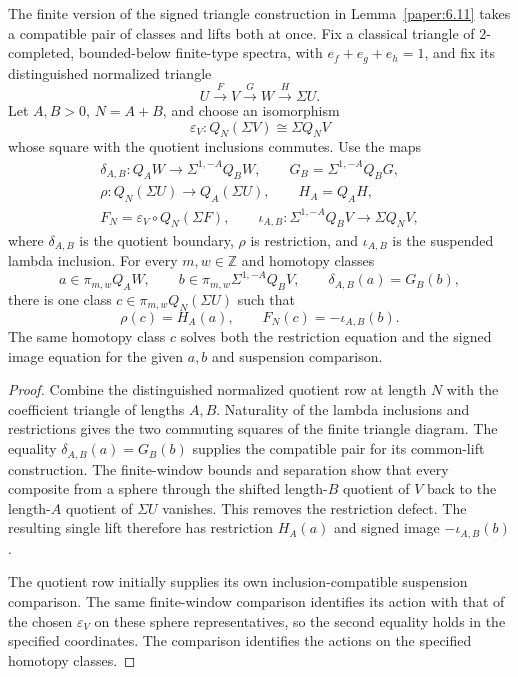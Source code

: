 \begin{lemma}
\label{sem:ProofTools:finite-common-lift}
The finite version of the signed triangle construction in
Lemma~\ref{paper:6.11} takes a compatible pair of classes and lifts
both at once.
Fix a classical triangle of $2$-completed, bounded-below finite-type spectra,
with $e_f+e_g+e_h=1$, and fix its distinguished normalized triangle
\[
 U\xrightarrow F V\xrightarrow G W\xrightarrow H\Sigma U.
\]
Let $A,B>0$, $N=A+B$, and choose an isomorphism
\[
 \varepsilon_V:Q_N(\Sigma V)\cong\Sigma Q_NV
\]
whose square with the quotient inclusions commutes. Use the maps
\[
\begin{gathered}
 \delta_{A,B}:Q_AW\longrightarrow\Sigma^{1,-A}Q_BW,
 \qquad G_B=\Sigma^{1,-A}Q_BG,\\
 \rho:Q_N(\Sigma U)\longrightarrow Q_A(\Sigma U),
 \qquad H_A=Q_AH,\\
 F_N=\varepsilon_V\circ Q_N(\Sigma F),\qquad
 \iota_{A,B}:\Sigma^{1,-A}Q_BV\longrightarrow\Sigma Q_NV,
\end{gathered}
\]
where $\delta_{A,B}$ is the quotient boundary, $\rho$ is restriction,
and $\iota_{A,B}$ is the suspended lambda inclusion.
For every $m,w\in\mathbb Z$ and homotopy classes
\[
 a\in\pi_{m,w}Q_AW,\qquad
 b\in\pi_{m,w}\Sigma^{1,-A}Q_BV,
 \qquad \delta_{A,B}(a)=G_B(b),
\]
there is one class $c\in\pi_{m,w}Q_N(\Sigma U)$ such that
\[
 \boxed{\rho(c)=H_A(a),\qquad F_N(c)=-\iota_{A,B}(b).}
\]
The same homotopy class $c$ solves both the restriction equation and
the signed image equation for the given $a,b$ and suspension comparison.
\end{lemma}
\begin{proof}
Combine the distinguished normalized quotient row at length $N$ with
the coefficient triangle of lengths $A,B$. Naturality of the lambda
inclusions and restrictions gives the two commuting squares of the
finite triangle diagram. The equality $\delta_{A,B}(a)=G_B(b)$ supplies
the compatible pair for its common-lift construction. The finite-window
bounds and separation show that every composite from a sphere through
the shifted length-$B$ quotient of $V$ back to the length-$A$ quotient of
$\Sigma U$ vanishes. This removes the restriction defect.
The resulting single lift therefore has restriction $H_A(a)$ and
signed image $-\iota_{A,B}(b)$.

The quotient row initially supplies its own inclusion-compatible
suspension comparison. The same finite-window comparison identifies its
action with that of the chosen $\varepsilon_V$ on these sphere
representatives, so the second equality holds in the specified
coordinates. The comparison identifies the actions on the specified homotopy classes.
\end{proof}


